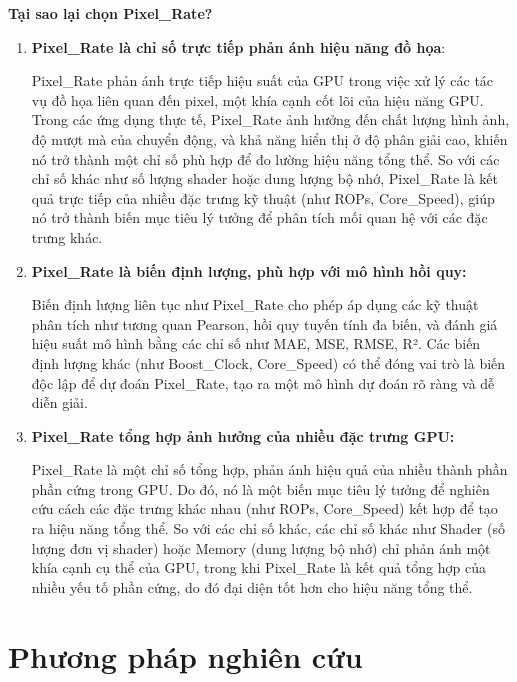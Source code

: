 {\small\textbf{Tại sao lại chọn Pixel\_Rate?}}
\begin{enumerate}
    \item \textbf{Pixel\_Rate là chỉ số trực tiếp phản ánh hiệu năng đồ họa}:
    
    Pixel\_Rate phản ánh trực tiếp hiệu suất của GPU trong việc xử lý các tác vụ đồ họa liên quan đến pixel, một khía cạnh cốt lõi của hiệu năng GPU. Trong các ứng dụng thực tế, Pixel\_Rate ảnh hưởng đến chất lượng hình ảnh, độ mượt mà của chuyển động, và khả năng hiển thị ở độ phân giải cao, khiến nó trở thành một chỉ số phù hợp để đo lường hiệu năng tổng thể. So với các chỉ số khác như số lượng shader hoặc dung lượng bộ nhớ, Pixel\_Rate là kết quả trực tiếp của nhiều đặc trưng kỹ thuật (như ROPs, Core\_Speed), giúp nó trở thành biến mục tiêu lý tưởng để phân tích mối quan hệ với các đặc trưng khác.
    
    \item \textbf{Pixel\_Rate là biến định lượng, phù hợp với mô hình hồi quy:}

    Biến định lượng liên tục như Pixel\_Rate cho phép áp dụng các kỹ thuật phân tích như tương quan Pearson, hồi quy tuyến tính đa biến, và đánh giá hiệu suất mô hình bằng các chỉ số như MAE, MSE, RMSE, R². Các biến định lượng khác (như Boost\_Clock, Core\_Speed) có thể đóng vai trò là biến độc lập để dự đoán Pixel\_Rate, tạo ra một mô hình dự đoán rõ ràng và dễ diễn giải.

    \item \textbf{Pixel\_Rate tổng hợp ảnh hưởng của nhiều đặc trưng GPU:}

    Pixel\_Rate là một chỉ số tổng hợp, phản ánh hiệu quả của nhiều thành phần phần cứng trong GPU. Do đó, nó là một biến mục tiêu lý tưởng để nghiên cứu cách các đặc trưng khác nhau (như ROPs, Core\_Speed) kết hợp để tạo ra hiệu năng tổng thể. So với các chỉ số khác, các chỉ số khác như Shader (số lượng đơn vị shader) hoặc Memory (dung lượng bộ nhớ) chỉ phản ánh một khía cạnh cụ thể của GPU, trong khi Pixel\_Rate là kết quả tổng hợp của nhiều yếu tố phần cứng, do đó đại diện tốt hơn cho hiệu năng tổng thể.
\end{enumerate}

\section{Phương pháp nghiên cứu}

